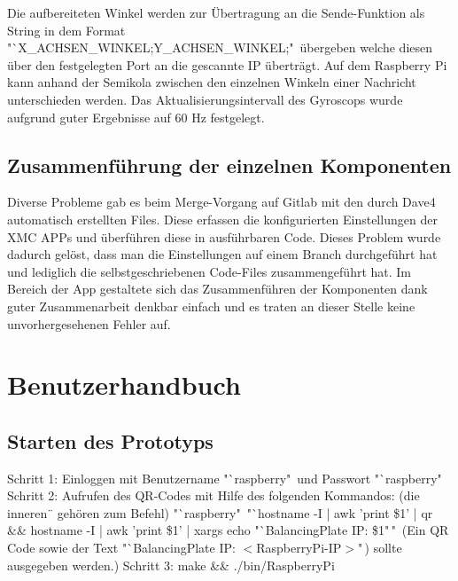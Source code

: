 \documentclass[12pt,a4paper,bibliography=totoc,listof=totoc]{scrartcl}
\begin{document}
Die aufbereiteten Winkel werden zur Übertragung an die Sende-Funktion als String in dem Format 
"`X\_ACHSEN\_WINKEL;Y\_ACHSEN\_WINKEL;"\ übergeben welche diesen über den festgelegten Port an die gescannte IP überträgt.
Auf dem Raspberry Pi kann anhand der Semikola zwischen den einzelnen Winkeln einer Nachricht unterschieden werden. 
Das Aktualisierungsintervall des Gyroscops wurde aufgrund guter Ergebnisse auf 60 Hz festgelegt. 

\subsection{Zusammenführung der einzelnen Komponenten}
Diverse Probleme gab es beim Merge-Vorgang auf Gitlab mit den durch Dave4 automatisch erstellten Files. 
Diese erfassen die konfigurierten Einstellungen der XMC APPs und überführen diese in ausführbaren Code. 
Dieses Problem wurde dadurch gelöst, dass man die Einstellungen auf einem Branch durchgeführt hat und 
lediglich die selbstgeschriebenen Code-Files zusammengeführt hat. Im Bereich der App gestaltete sich das 
Zusammenführen der Komponenten dank guter Zusammenarbeit denkbar einfach und es traten an dieser Stelle 
keine unvorhergesehenen Fehler auf.

\pagebreak
\section{Benutzerhandbuch}
\subsection{Starten des Prototyps}
Schritt 1:
Einloggen mit Benutzername "`raspberry"\ und Passwort "`raspberry"\
\newline
Schritt 2: Aufrufen des QR-Codes mit Hilfe des folgenden Kommandos: 
\newline(die inneren \"\, gehören zum Befehl)
\newline\newline
"`raspberry"\ "`hostname -I | awk '{print \$1}' | qr \&\& hostname -I | awk '{print \$1}' | xargs echo "`BalancingPlate IP: \$1"\,"\,
\newline\newline
    (Ein QR Code sowie der Text "`BalancingPlate IP: $<$RaspberryPi-IP$>$"\,) sollte ausgegeben werden.)
\newline
Schritt 3:
\newline make \&\& ./bin/RaspberryPi
\end{document}
